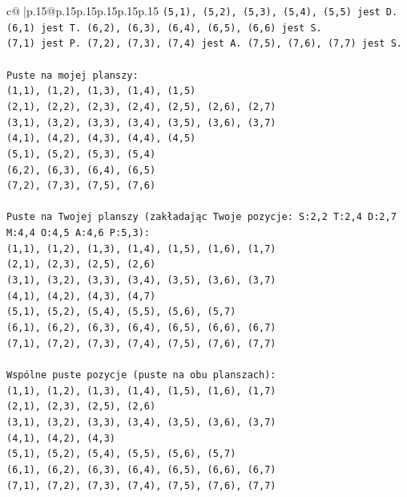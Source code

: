 \documentclass{article}
\begin{document}
{\begin{supertabular}{c@{$\;$}|p{.15\linewidth}@{}p{.15\linewidth}p{.15\linewidth}p{.15\linewidth}p{.15\linewidth}p{.15\linewidth}}
{{{\texttt{(5,1), (5,2), (5,3), (5,4), (5,5) jest D.} \\
\texttt{(6,1) jest T. (6,2), (6,3), (6,4), (6,5), (6,6) jest S.} \\
\texttt{(7,1) jest P. (7,2), (7,3), (7,4) jest A. (7,5), (7,6), (7,7) jest S.} \\
\\ 
\texttt{Puste na mojej planszy:} \\
\texttt{(1,1), (1,2), (1,3), (1,4), (1,5)} \\
\texttt{(2,1), (2,2), (2,3), (2,4), (2,5), (2,6), (2,7)} \\
\texttt{(3,1), (3,2), (3,3), (3,4), (3,5), (3,6), (3,7)} \\
\texttt{(4,1), (4,2), (4,3), (4,4), (4,5)} \\
\texttt{(5,1), (5,2), (5,3), (5,4)} \\
\texttt{(6,2), (6,3), (6,4), (6,5)} \\
\texttt{(7,2), (7,3), (7,5), (7,6)} \\
\\ 
\texttt{Puste na Twojej planszy (zakładając Twoje pozycje: S:2,2 T:2,4 D:2,7 M:4,4 O:4,5 A:4,6 P:5,3):} \\
\texttt{(1,1), (1,2), (1,3), (1,4), (1,5), (1,6), (1,7)} \\
\texttt{(2,1), (2,3), (2,5), (2,6)} \\
\texttt{(3,1), (3,2), (3,3), (3,4), (3,5), (3,6), (3,7)} \\
\texttt{(4,1), (4,2), (4,3), (4,7)} \\
\texttt{(5,1), (5,2), (5,4), (5,5), (5,6), (5,7)} \\
\texttt{(6,1), (6,2), (6,3), (6,4), (6,5), (6,6), (6,7)} \\
\texttt{(7,1), (7,2), (7,3), (7,4), (7,5), (7,6), (7,7)} \\
\\ 
\texttt{Wspólne puste pozycje (puste na obu planszach):} \\
\texttt{(1,1), (1,2), (1,3), (1,4), (1,5), (1,6), (1,7)} \\
\texttt{(2,1), (2,3), (2,5), (2,6)} \\
\texttt{(3,1), (3,2), (3,3), (3,4), (3,5), (3,6), (3,7)} \\
\texttt{(4,1), (4,2), (4,3)} \\
\texttt{(5,1), (5,2), (5,4), (5,5), (5,6), (5,7)} \\
\texttt{(6,1), (6,2), (6,3), (6,4), (6,5), (6,6), (6,7)} \\
\texttt{(7,1), (7,2), (7,3), (7,4), (7,5), (7,6), (7,7)} \\
}}}
\end{supertabular}}
\end{document}
